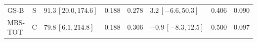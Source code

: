 \begin{longtable}{lcp{37mm}rrp{37mm}rr}
GS-B & S & \(91.3\,[20.0,174.6]\) & 0.188 & 0.278 & \(3.2\,[-6.6,50.3]\) & 0.406 & 0.090\\
MBS-TOT & C & \(79.8\,[6.1,214.8]\) & 0.188 & 0.306 & \(-0.9\,[-8.3,12.5]\) & 0.500 & 0.097\\

\end{longtable}
